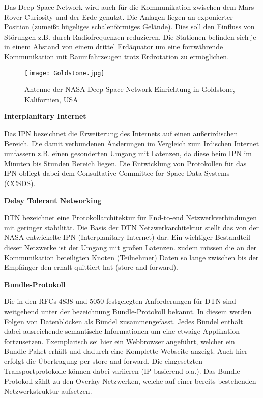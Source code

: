 Das Deep Space Network wird auch f{\"u}r die Kommunikation zwischen dem Mars
Rover Curiosity und der Erde genutzt. Die Anlagen liegen an exponierter Position
(zumei{\ss}t h{\"u}geliges schalenf{\"o}rmiges Gel{\"a}nde). Dies soll den
Einfluss von St{\"o}rungen z.B. durch Radiofrequenzen reduzieren. Die Stationen
befinden sich je in einem Abstand von einem drittel Erd{\"a}quator um eine
fortw{\"a}hrende Kommunikation mit Raumfahrzeugen trotz Erdrotation zu
erm{\"o}glichen.

\begin{figure}[H]
\centering
\texttt{[image: Goldstone.jpg]}
\caption{Antenne der NASA Deep Space Network Einrichtung in Goldstone,
Kalifornien, USA}
\label{fig:Goldstone}
\end{figure}

\textbf{Interplanitary Internet}

Das IPN bezeichnet die Erweiterung des Internets auf einen au{\ss}erirdischen
Bereich. Die damit verbundenen {\"A}nderungen im Vergleich zum Irdischen
Internet umfassern z.B. einen gesonderten Umgang mit Latenzen, da diese beim IPN
im Minuten bis Stunden Bereich liegen. Die Entwicklung von Protokollen
f{\"u}r das IPN obliegt dabei dem Consultative Committee for Space Data Systems
(CCSDS).

\textbf{Delay Tolerant Networking}

DTN bezeichnet eine Protokollarchitektur f{\"u}r End-to-end Netzwerkverbindungen
mit geringer stabilit{\"a}t. Die Basis der DTN Netzwerkarchitektur stellt das
von der NASA entwickelte IPN (Interplanitary Internet) dar. Ein wichtiger
Bestandteil dieser Netzwerke ist der Umgang mit gro{\ss}en Latenzen. zudem
m{\"u}ssen die an der Kommunikation beteiligten Knoten (Teilnehmer) Daten so
lange zwischen bis der Empf{\"a}nger den erhalt quittiert hat
(store-and-forward).

\textbf{Bundle-Protokoll}

Die in den RFCs 4838 und 5050 festgelegten Anforderungen f{\"u}r DTN sind
weitgehend unter der bezeichnung Bundle-Protokoll bekannt. In diesem werden Folgen von
Datenbl{\"o}cken als B{\"u}ndel zusammengefasst. Jedes B{\"u}ndel enth{\"a}lt
dabei ausreichende semantische Informationen um eine etwaige Applikation
fortzusetzen. Exemplarisch sei hier ein Webbrowser angef{\"u}hrt, welcher ein
Bundle-Paket erh{\"a}lt und dadurch eine Komplette Webseite anzeigt. Auch hier
erfolgt die {\"U}bertragung per store-and-forward. Die eingesetzten
Transportprotokolle k{\"o}nnen dabei variieren (IP basierend o.a.). Das
Bundle-Protokoll z{\"a}hlt zu den Overlay-Netzwerken, welche auf einer bereits
bestehenden Netzwerkstruktur aufsetzen.










